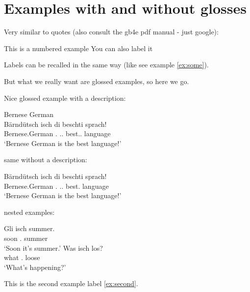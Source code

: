 \documentclass[12pt]{article}
\begin{document}
\section{Examples with and without glosses}

Very similar to quotes (also consult the gb4e pdf manual - just google):

\begin{exe}
	\ex This is a numbered example
	\ex \label{ex:some} You can also label it
\end{exe}

Labels can be recalled in the same way (like see example \ref{ex:some}).


But what we really want are glossed examples, so here we go.

Nice glossed example with a description:
\begin{exe}
	\ex Bernese German \\
	\gll Bärndütsch isch di beschti sprach! \\
		Bernese.German \Cop.\Tsg{} \Art.\Def.\F{} best.\Conv.\F{} language		\\
	\glt `Bernese German is the best language!'\protect\footnotemark \hfill 
	\label{ex:first}
\end{exe}


same without a description:
\begin{exe}
	\ex \gll Bärndütsch isch di beschti sprach! \\
		Bernese.German \Cop.\Tsg{} \Art.\Def.\F{} best.\F{} language		\\
	\glt `Bernese German is the best language!' \hfill 
	\label{ex:second}
\end{exe}


nested examples:
\begin{exe} \ex
	\begin{xlist}
	\ex \gll Gli isch summer.	\\
		soon \Cop.\Tsg{} summer			\\
	\glt `Soon it's summer.' \hfill \citep[]{}
	\label{ex:third}
	\ex \gll Was isch los?	\\
		what \Cop.\Tsg{} loose			\\
	\glt `What's happening?' \hfill \citep[]{}
	\label{ex:fourth}
	\end{xlist}
\end{exe}



This is the second example label \ref{ex:second}.
\end{document}
